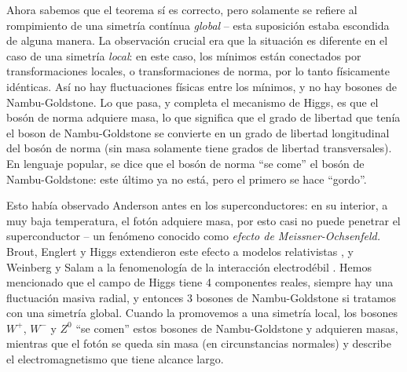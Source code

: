 Ahora sabemos que el teorema s\'i es correcto, pero solamente
se refiere al rompimiento de una simetr\'ia cont\'inua
{\em global} -- esta suposici\'on estaba escondida de alguna manera.
La observaci\'on crucial era que la situaci\'on es diferente
en el caso de una simetr\'ia {\em local}: en este caso, los
m\'inimos est\'an conectados por transformaciones locales, o
transformaciones de norma, por lo tanto f\'isicamente id\'enticas.
As\'i no hay fluctuaciones f\'isicas entre los m\'inimos, y no hay
bosones de Nambu-Goldstone. Lo que pasa, y completa el mecanismo
de Higgs, es que el bos\'on de norma adquiere masa, lo que significa
que el grado de libertad que ten\'ia el boson de Nambu-Goldstone
se convierte en un grado de libertad longitudinal del bos\'on de
norma (sin masa solamente tiene grados de libertad transversales).
En lenguaje popular, se dice que el bos\'on de norma ``se come''
el bos\'on de Nambu-Goldstone: este \'ultimo ya no est\'a, pero
el primero se hace ``gordo''.

Esto hab\'ia observado Anderson antes en los superconductores: en
su interior, a muy baja temperatura, el fot\'on adquiere masa,
por esto casi no puede penetrar el superconductor -- un fen\'omeno
conocido como {\em efecto de Meissner-Ochsenfeld.}
Brout, Englert y Higgs extendieron este efecto a modelos
relativistas \cite{EB,Higgs}, y Weinberg y Salam a la fenomenolog\'ia
de la interacci\'on electrod\'ebil \cite{Weinberg,Salam}.
Hemos mencionado que el campo de
Higgs tiene 4 componentes reales, siempre hay una fluctuaci\'on
masiva radial, y entonces 3 bosones de Nambu-Goldstone si tratamos
con una simetr\'ia global. Cuando la promovemos a una simetr\'ia
local, los bosones $W^+$, $W^-$ y $Z^0$ ``se comen'' estos
bosones de Nambu-Goldstone y adquieren masas,
mientras que el fot\'on se queda sin masa (en circunstancias
normales) y describe el electromagnetismo que tiene alcance largo.


